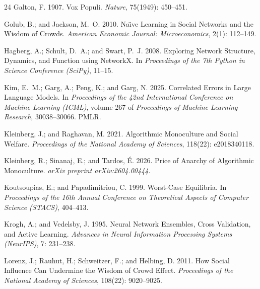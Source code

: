 \documentclass
[letterpaper]{article}
\begin{document}
\begin{thebibliography}{24}
Galton, F. 1907.
\newblock Vox Populi.
\newblock \emph{Nature}, 75(1949): 450--451.

Golub, B.; and Jackson, M.~O. 2010.
\newblock Na{\"\i}ve Learning in Social Networks and the Wisdom of Crowds.
\newblock \emph{American Economic Journal: Microeconomics}, 2(1): 112--149.

Hagberg, A.; Schult, D.~A.; and Swart, P.~J. 2008.
\newblock Exploring Network Structure, Dynamics, and Function using NetworkX.
\newblock In \emph{Proceedings of the 7th Python in Science Conference (SciPy)}, 11--15.

Kim, E.~M.; Garg, A.; Peng, K.; and Garg, N. 2025.
\newblock Correlated Errors in Large Language Models.
\newblock In \emph{Proceedings of the 42nd International Conference on Machine Learning (ICML)}, volume 267 of \emph{Proceedings of Machine Learning Research}, 30038--30066. PMLR.

Kleinberg, J.; and Raghavan, M. 2021.
\newblock Algorithmic Monoculture and Social Welfare.
\newblock \emph{Proceedings of the National Academy of Sciences}, 118(22): e2018340118.

Kleinberg, R.; Sinanaj, E.; and Tardos, {\'E}. 2026.
\newblock Price of Anarchy of Algorithmic Monoculture.
\newblock \emph{arXiv preprint arXiv:2604.00444}.

Koutsoupias, E.; and Papadimitriou, C. 1999.
\newblock Worst-Case Equilibria.
\newblock In \emph{Proceedings of the 16th Annual Conference on Theoretical Aspects of Computer Science (STACS)}, 404--413.

Krogh, A.; and Vedelsby, J. 1995.
\newblock Neural Network Ensembles, Cross Validation, and Active Learning.
\newblock \emph{Advances in Neural Information Processing Systems (NeurIPS)}, 7: 231--238.

Lorenz, J.; Rauhut, H.; Schweitzer, F.; and Helbing, D. 2011.
\newblock How Social Influence Can Undermine the Wisdom of Crowd Effect.
\newblock \emph{Proceedings of the National Academy of Sciences}, 108(22): 9020--9025.


\end{thebibliography}
\end{document}
